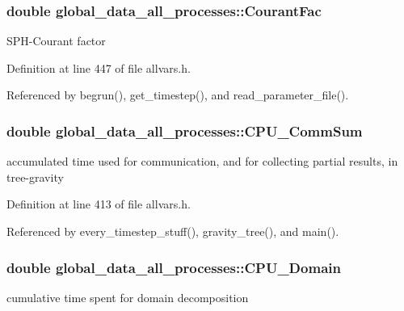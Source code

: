 \hypertarget{structglobal__data__all__processes_aa4cf405da4e0a6fc588f5a5ba7e8fde8}{
\subsubsection[{CourantFac}]{\setlength{\rightskip}{0pt plus 5cm}double {\bf global\_\-data\_\-all\_\-processes::CourantFac}}}
\label{structglobal__data__all__processes_aa4cf405da4e0a6fc588f5a5ba7e8fde8}
SPH-\/Courant factor 

Definition at line 447 of file allvars.h.



Referenced by begrun(), get\_\-timestep(), and read\_\-parameter\_\-file().

\hypertarget{structglobal__data__all__processes_a41ab81d126219e1ff8119f8400428216}{
\subsubsection[{CPU\_\-CommSum}]{\setlength{\rightskip}{0pt plus 5cm}double {\bf global\_\-data\_\-all\_\-processes::CPU\_\-CommSum}}}
\label{structglobal__data__all__processes_a41ab81d126219e1ff8119f8400428216}
accumulated time used for communication, and for collecting partial results, in tree-\/gravity 

Definition at line 413 of file allvars.h.



Referenced by every\_\-timestep\_\-stuff(), gravity\_\-tree(), and main().

\hypertarget{structglobal__data__all__processes_a786736d9e91341733e286f6e03ab26a5}{
\subsubsection[{CPU\_\-Domain}]{\setlength{\rightskip}{0pt plus 5cm}double {\bf global\_\-data\_\-all\_\-processes::CPU\_\-Domain}}}
\label{structglobal__data__all__processes_a786736d9e91341733e286f6e03ab26a5}
cumulative time spent for domain decomposition 

